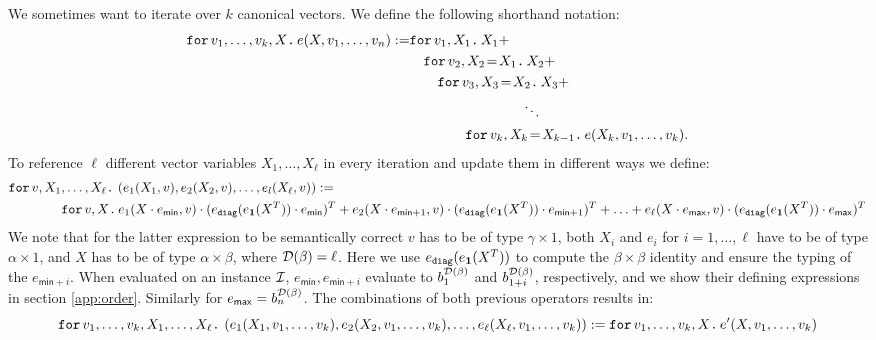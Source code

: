 We sometimes want to iterate over $k$ canonical vectors. We define the following shorthand notation:
\begin{align*}
  \ffor{v_1,\ldots, v_k}{X}{e(X,v_1,\ldots, v_n)}:= &\ffor{v_1}{X_1}{X_1 +} \\
  &\hspace{1em}\initf{X_1}{v_2}{X_2}{X_2 + } \\
  &\hspace{2em}\initf{X_2}{v_3}{X_3}{X_3 + } \\
  &\hspace{8em}\ddots \\
  &\hspace{4em}\initf{X_{k-1}}{v_k}{X_k}{ e(X_k,v_1,\ldots, v_k)}.
\end{align*}
To reference $\ell$ different vector variables $X_1,\ldots,X_\ell$ in every iteration and update them in different ways we define:
\begin{align*}
&\ffor{v}{X_1,\ldots, X_\ell}{\left( e_1(X_1,v), e_2(X_2,v), \ldots, e_l(X_\ell,v) \right)} :=\\
&\hspace{4em}\ffor{v}{X}{e_1(X\cdot e_{\mathsf{min}},v)\cdot (e_{\diag}(e_{\ones}(X^T))\cdot e_{\mathsf{min}})^T + e_2(X\cdot e_{\mathsf{min} + 1},v)\cdot (e_{\diag}(e_{\ones}(X^T))\cdot e_{\mathsf{min} + 1})^T + \ldots + e_\ell(X\cdot e_{\mathsf{max}},v)\cdot (e_{\diag}(e_{\ones}(X^T))\cdot e_{\mathsf{max}})^T}
\end{align*}
We note that for the latter expression to be semantically correct $v$ has to be of type $\gamma\times 1$, 
both $X_i$ and $e_i$ for $ i=1,\ldots,\ell$ have to be of type $\alpha\times 1$, 
and $X$ has to be of type $\alpha\times\beta$, where $\dom(\beta)=\ell$. Here
we use $e_{\diag}(e_{\ones}(X^T))$ to compute the $\beta\times\beta$ identity and ensure the typing of the
$e_{\mathsf{min} + i}$.
When evaluated on an instance $\I$,
$e_{\mathsf{min}}, e_{\mathsf{min} + i}$ evaluate to $b_1^{\dom(\beta)}$ and $b_{1+i}^{\dom(\beta)}$, 
respectively, and we show their defining expressions in section \ref{app:order}.
Similarly for $e_{\mathsf{max}}=b_n^{\dom(\beta)}$.
The combinations of both previous operators results in:
$$
\ffor{v_1,\ldots, v_k}{X_1,\ldots, X_\ell}{\left( e_1(X_1,v_1,\ldots, v_k), e_2(X_2,v_1,\ldots, v_k), \ldots, e_\ell(X_\ell,v_1,\ldots, v_k) \right)} :=\ffor{v_1,\ldots, v_k}{X}{e'(X,v_1,\ldots, v_k)}
$$
